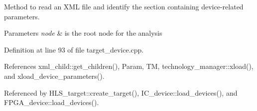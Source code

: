 Method to read an X\+ML file and identify the section containing device-\/related parameters. 


\begin{DoxyParams}{Parameters}
{\em node} & is the root node for the analysis \\
\hline
\end{DoxyParams}


Definition at line 93 of file target\+\_\+device.\+cpp.



References xml\+\_\+child\+::get\+\_\+children(), Param, TM, technology\+\_\+manager\+::xload(), and xload\+\_\+device\+\_\+parameters().



Referenced by H\+L\+S\+\_\+target\+::create\+\_\+target(), I\+C\+\_\+device\+::load\+\_\+devices(), and F\+P\+G\+A\+\_\+device\+::load\+\_\+devices().

